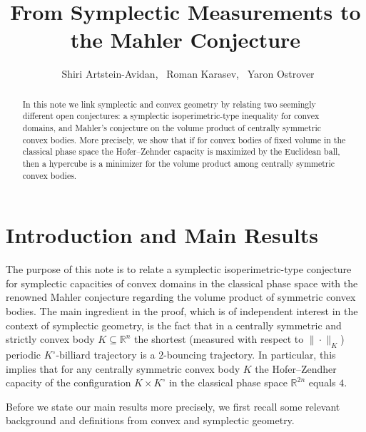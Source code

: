 \documentclass[11pt]{article}
\def\RR{\mathbb{R}}
\begin{document}
\title{From Symplectic Measurements to the Mahler Conjecture} 
\author{ \ Shiri Artstein-Avidan, \  Roman  Karasev,    \ Yaron Ostrover}
\date{}
\maketitle
\begin{abstract}
In this note we link symplectic and convex geometry by relating two 
seemingly different open conjectures: a symplectic isoperimetric-type inequality for
convex domains, and  Mahler's conjecture on the volume
product of centrally symmetric convex bodies. More precisely, we show that if for convex bodies of fixed volume  in the classical phase space the Hofer--Zehnder capacity is maximized by the Euclidean ball, then a hypercube is a minimizer for the volume product  among  centrally symmetric convex bodies.
\end{abstract}


\section{Introduction and Main Results}

The purpose of this note is to relate a symplectic isoperimetric-type
conjecture for symplectic capacities of convex domains in the classical phase space with the renowned
Mahler conjecture regarding the volume product of symmetric convex bodies.
The main ingredient in the proof, which is of independent interest in the context of symplectic geometry, is the fact that in a centrally symmetric and strictly convex body $K\subseteq \RR^n$
the shortest (measured with respect to $\| \cdot \|_K$) periodic $K^{\circ}$-billiard trajectory  is a $2$-bouncing trajectory. In particular, this implies that for any  centrally symmetric convex body  $K$ the Hofer--Zendher capacity of the configuration $K\times K^{\circ}$ in the classical phase space $\RR^{2n}$ equals $4$. 


Before we state our main results more precisely, we first recall some relevant
background and definitions from convex and symplectic geometry.
\end{document}
